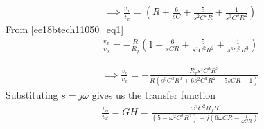 \begin{enumerate}[label=\thesection.\arabic*.,ref=\thesection.\theenumi]
\begin{align}
    \implies\frac{v_x}{i_x} = (R+\frac{6}{sC}+\frac{5}{s^2C^2R}+\frac{1}{s^3C^3R^2})
\end{align}
From \eqref{ee18btech11050_eq1}
\begin{align}
    \frac{v_x}{v_o} = -\frac{R}{R_f}(1+\frac{6}{sCR}+\frac{5}{s^2C^2R^2}+\frac{1}{s^3C^3R^3})
\end{align}

\begin{align}
    \implies \frac{v_o}{v_x} = -\frac{R_fs^3C^3R^3}{R(s^3C^3R^3+6s^2C^2R^2+5sCR+1)}
\end{align}
Substituting $s=j\omega$ gives us the transfer function
\begin{align}
    \frac{v_o}{v_x} = GH = \frac{\omega^2C^2R_fR}{(5-\omega^2C^2R^2)+j(6\omega CR-\frac{1}{\omega CR})}
    \label{ee18btech11050_eq2}
\end{align}


\end{enumerate}
